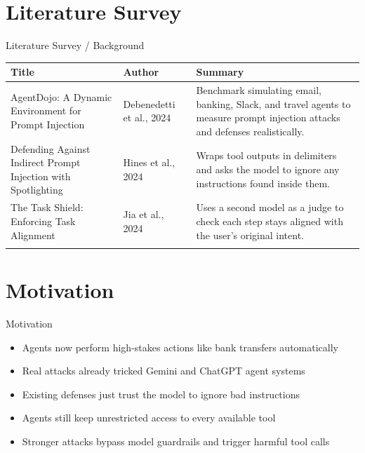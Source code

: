 \documentclass[10pt]{beamer}
\begin{document}
\section{Literature Survey}
\begin{frame}{Literature Survey / Background}
  \small
  \begin{tabular}{@{}p{2.7cm}p{2.3cm}p{5.6cm}@{}}
    \toprule
    \textbf{Title} & \textbf{Author} & \textbf{Summary} \\
    \midrule
    AgentDojo: A Dynamic Environment for Prompt Injection & Debenedetti et al., 2024 & Benchmark simulating email, banking, Slack, and travel agents to measure prompt injection attacks and defenses realistically. \\
    \addlinespace
    Defending Against Indirect Prompt Injection with Spotlighting & Hines et al., 2024 & Wraps tool outputs in delimiters and asks the model to ignore any instructions found inside them. \\
    \addlinespace
    The Task Shield: Enforcing Task Alignment & Jia et al., 2024 & Uses a second model as a judge to check each step stays aligned with the user's original intent. \\
    \addlinespace
    \bottomrule
  \end{tabular}
\end{frame}
\section{Motivation}
\begin{frame}{Motivation}
\begin{itemize}
  \item Agents now perform high-stakes actions like bank transfers automatically
  \item Real attacks already tricked Gemini and ChatGPT agent systems
  \item Existing defenses just trust the model to ignore bad instructions
  \item Agents still keep unrestricted access to every available tool
  \item Stronger attacks bypass model guardrails and trigger harmful tool calls
\end{itemize}
\end{frame}
\end{document}
